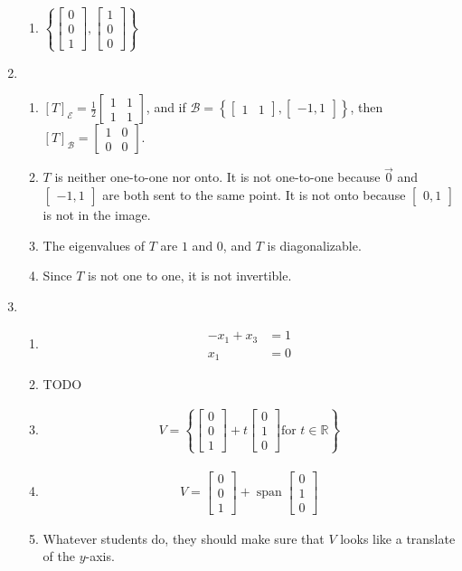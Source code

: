 \documentclass[red]{tutorial}
\newcommand{\R}{\mathbb{R}}
\newcommand{\mat}[1]{\begin{bmatrix} #1 %
\end{bmatrix}}
\DeclareMathOperator{\Span} {span}
\theoremstyle{definition}
\theoremstyle{theorem}
\begin{document}
\begin{solutions}
\begin{enumerate}
\begin{enumerate}
        \item $\left\{\mat{0\\0\\1} , \mat{1\\0\\0}\right\}$
      \end{enumerate}
    \item
      \begin{enumerate}
        \item $[T]_{\mathcal{E}} = \frac12\mat{1&1\\1&1}$, and 
          if $\mathcal{B} = \left\{\mat{1&1},\mat{-1,1}\right\}$, then 
          $[T]_{\mathcal{B}} = \mat{1&0\\0&0}$.
        \item $T$ is neither one-to-one nor onto. It is not 
          one-to-one because $\vec 0$ and $\mat{-1,1}$ are both sent 
          to the same point. It is not onto because $\mat{0,1}$ is not 
          in the image.
        \item The eigenvalues of $T$ are $1$ and $0$, 
          and $T$ is diagonalizable.
        \item Since $T$ is not one to one, it is not invertible.
      \end{enumerate}
    \item
      \begin{enumerate}
        \item
          \begin{align*}
            -x_1 + x_3 &= 1\\
            x_1 &= 0
          \end{align*}
        \item TODO
        \item 
          \begin{align*}
            V = \left\{\mat{0\\0\\1} + t\mat{0\\1\\0}%
            \text{for $t\in \R$}\right\}
          \end{align*}
        \item 
          \begin{align*}
            V = \mat{0\\0\\1} + \Span{\mat{0\\1\\0}}
          \end{align*}
        \item Whatever students do, they should make sure that $V$ 
          looks like a translate of the $y$-axis.
      \end{enumerate}
  \end{enumerate}
\end{solutions}
\end{document}
